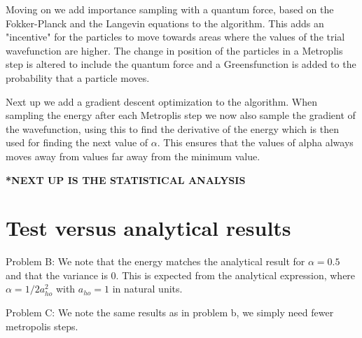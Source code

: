 \documentclass[a4paper, 10pt, english]{revtex4-2} %
\begin{document}
    Moving on we add importance sampling with a quantum force, based on the Fokker-Planck and the Langevin equations to the algorithm.
    This adds an "incentive" for the particles to move towards areas where the values of the trial wavefunction are higher.
    The change in position of the particles in a Metroplis step is altered to include the quantum force and a Greensfunction is added to the probability that a particle moves.

    Next up we add a gradient descent optimization to the algorithm.
    When sampling the energy after each Metroplis step we now also sample the gradient of the wavefunction, using this to find the derivative of the energy which is then used for finding the next value of $\alpha$.
    This ensures that the values of alpha always moves away from values far away from the minimum value.

    \textbf{*NEXT UP IS THE STATISTICAL ANALYSIS}
    
\section*{\large Test versus analytical results}
    Problem B: We note that the energy matches the analytical result for $\alpha = 0.5$ and that the variance is 0.
    This is expected from the analytical expression, where $\alpha = 1/2a_{ho}^2$ with $a_{ho} = 1$ in natural units.
    
    Problem C: We note the same results as in problem b, we simply need fewer metropolis steps.
\end{document}
